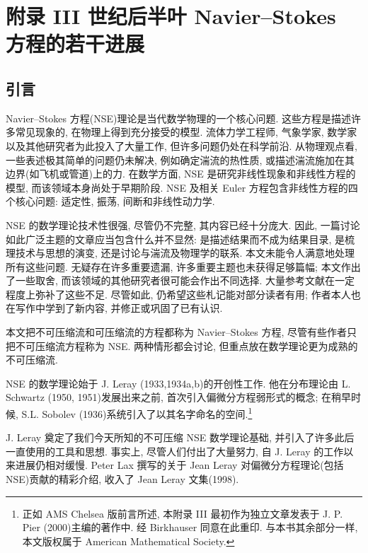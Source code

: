 \clearpage
{}
\section*{附录 III 世纪后半叶 Navier--Stokes 方程的若干进展}
\label{app:twentieth-century-developments}
\setcounter{section}{0}
\setcounter{equation}{0}
\renewcommand{\theequation}{\arabic{equation}}

\hypertarget{appendix-03-page-352}{}
\subsection*{引言}

Navier--Stokes 方程(NSE)理论是当代数学物理的一个核心问题. 这些方程是描述许多常见现象的, 在物理上得到充分接受的模型. 流体力学工程师, 气象学家, 数学家以及其他研究者为此投入了大量工作, 但许多问题仍处在科学前沿. 从物理观点看, 一些表述极其简单的问题仍未解决, 例如确定湍流的热性质, 或描述湍流施加在其边界(如飞机或管道)上的力. 在数学方面, NSE 是研究非线性现象和非线性方程的模型, 而该领域本身尚处于早期阶段. NSE 及相关 Euler 方程包含非线性方程的四个核心问题: 适定性, 振荡, 间断和非线性动力学.

NSE 的数学理论技术性很强, 尽管仍不完整, 其内容已经十分庞大. 因此, 一篇讨论如此广泛主题的文章应当包含什么并不显然: 是描述结果而不成为结果目录, 是梳理技术与思想的演变, 还是讨论与湍流及物理学的联系. 本文未能令人满意地处理所有这些问题. 无疑存在许多重要遗漏, 许多重要主题也未获得足够篇幅; 本文作出了一些取舍, 而该领域的其他研究者很可能会作出不同选择. 大量参考文献在一定程度上弥补了这些不足. 尽管如此, 仍希望这些札记能对部分读者有用; 作者本人也在写作中学到了新内容, 并修正或巩固了已有认识.

本文把不可压缩流和可压缩流的方程都称为 Navier--Stokes 方程, 尽管有些作者只把不可压缩流方程称为 NSE. 两种情形都会讨论, 但重点放在数学理论更为成熟的不可压缩流.

NSE 的数学理论始于 J. Leray (1933,\allowbreak 1934a,b)的开创性工作. 他在分布理论由 L. Schwartz (1950, 1951)发展出来之前, 首次引入偏微分方程弱形式的概念; 在稍早时候, S.L. Sobolev (1936)系统引入了以其名字命名的空间.\footnote{正如 AMS Chelsea 版前言所述, 本附录 III 最初作为独立文章发表于 J. P. Pier (2000)主编的著作中. 经 Birkhauser 同意在此重印. 与本书其余部分一样, 本文版权属于 American Mathematical Society.}

\hypertarget{appendix-03-page-353}{}
J. Leray 奠定了我们今天所知的不可压缩 NSE 数学理论基础, 并引入了许多此后一直使用的工具和思想. 事实上, 尽管人们付出了大量努力, 自 J. Leray 的工作以来进展仍相对缓慢. Peter Lax 撰写的关于 Jean Leray 对偏微分方程理论(包括 NSE)贡献的精彩介绍, 收入了 Jean Leray 文集(1998).

